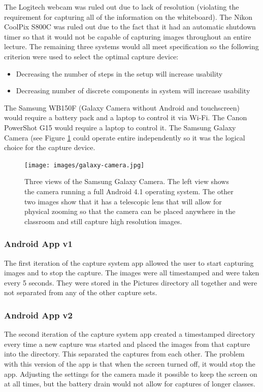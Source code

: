 \documentclass[]{article}
\begin{document}
				\noindent
				The Logitech webcam was ruled out due to lack of resolution (violating the requirement for capturing all of the information on the whiteboard). The Nikon CoolPix S800C was ruled out due to the fact that it had an automatic shutdown timer so that it would not be capable of capturing images throughout an entire lecture. The remaining three systems would all meet specification so the following criterion were used to select the optimal capture device:
				\begin{itemize}
					\item Decreasing the number of steps in the setup will increase usability
					\item Decreasing number of discrete components in system will increase usability
				\end{itemize}
				The Samsung WB150F (Galaxy Camera without Android and touchscreen) would require a battery pack and a laptop to control it via Wi-Fi. The Canon PowerShot G15 would require a laptop to control it. The Samsung Galaxy Camera (see Figure \ref{img:galaxy-camera} could operate entire independently so it was the logical choice for the capture device. 
				
				\begin{figure}[h]
					\centering
					\texttt{[image: images/galaxy-camera.jpg]}
					\caption{Three views of the Samsung Galaxy Camera. The left view shows the camera running a full Android 4.1 operating system. The other two images show that it has a telescopic lens that will allow for physical zooming so that the camera can be placed anywhere in the classroom and still capture high resolution images.}		
					\label{img:galaxy-camera}
				\end{figure}
			
			\subsubsection{Android App v1}
				The first iteration of the capture system app allowed the user to start capturing images and to stop the capture. The images were all timestamped and were taken every 5 seconds. They were stored in the Pictures directory all together and were not separated from any of the other capture sets.
				
			\subsubsection{Android App v2}
				The second iteration of the capture system app created a timestamped directory every time a new capture was started and placed the images from that capture into the directory. This separated the captures from each other. The problem with this version of the app is that when the screen turned off, it would stop the app. Adjusting the settings for the camera made it possible to keep the screen on at all times, but the battery drain would not allow for captures of longer classes.
				
\end{document}
